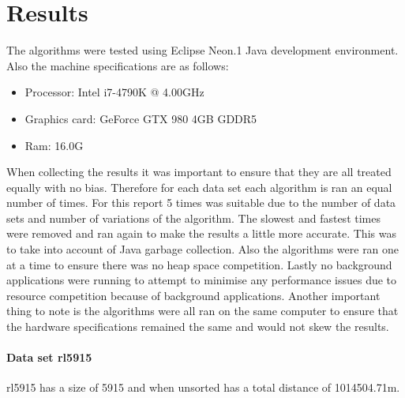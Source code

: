 \documentclass[conference,backref=page]{acmsiggraph}
\begin{document}
\section{Results}

The algorithms were tested using Eclipse Neon.1 Java development environment. Also the machine specifications are as follows:
\begin{itemize}
\item Processor:	Intel i7-4790K @ 4.00GHz
\item Graphics card:	GeForce GTX 980	4GB GDDR5
\item Ram:	16.0G

\end{itemize}

When collecting the results it was important to ensure that they are all treated equally with no bias. Therefore for each data set each algorithm is ran an equal number of times. For this report 5 times was suitable due to the number of data sets and number of variations of the algorithm. The slowest and fastest times were removed and ran again to make the results a little more accurate. This was to take into account of Java garbage collection. Also the algorithms were ran one at a time to ensure there was no heap space competition. Lastly no background applications were running to attempt to minimise any performance issues due to resource competition because of background applications. Another important thing to note is the algorithms were all ran on the same computer to ensure that the hardware specifications remained the same and would not skew the results.


\paragraph{Data set rl5915} \hfill

rl5915 has a size of 5915 and when unsorted has a total distance of 1014504.71m.
\end{document}
